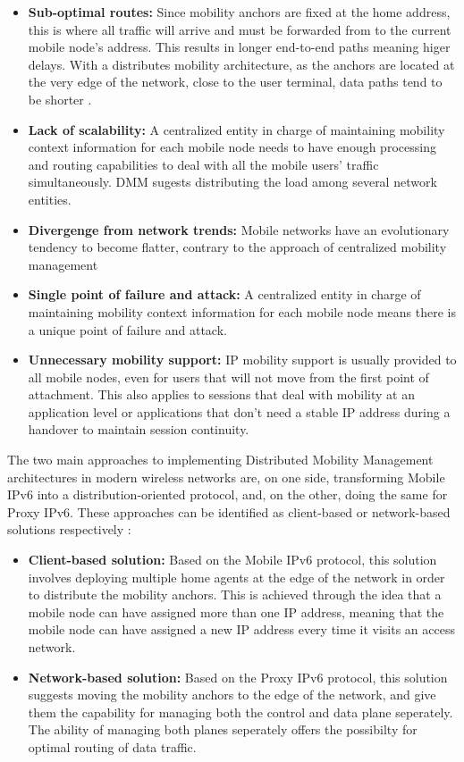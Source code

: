 \begin{itemize}
\item{\textbf{Sub-optimal routes:} Since mobility anchors are fixed at the home address, this is where all traffic will arrive and must be forwarded from to the current mobile node's address. This results in longer end-to-end paths meaning higer delays. With a distributes mobility architecture, as the anchors are located at the very edge of the network, close to the user terminal, data paths tend to be shorter \cite{fama}.}
\item{\textbf{Lack of scalability:} A centralized entity in charge of maintaining mobility context information for each mobile node needs to have enough processing and routing capabilities to deal with all the mobile users' traffic simultaneously. DMM sugests distributing the load among several network entities.} 
\item{\textbf{Divergenge from network trends:} Mobile networks have an evolutionary tendency to become flatter, contrary to the approach of centralized mobility management}
\item{\textbf{Single point of failure and attack:} A centralized entity in charge of maintaining mobility context information for each mobile node means there is a unique point of failure and attack.}
\item{\textbf{Unnecessary mobility support:} IP mobility support is usually provided to all mobile nodes, even for users that will not move from the first point of attachment. This also applies to sessions that deal with mobility at an application level or applications that don't need a stable IP address during a handover to maintain session continuity.}
\end{itemize}

The two main approaches to implementing Distributed Mobility Management architectures in modern wireless networks are, on one side, transforming Mobile IPv6 into a distribution-oriented protocol, and, on the other, doing the same for Proxy IPv6. These approaches can be identified as client-based or network-based solutions respectively \cite{dmm_standard_land}:

\begin{itemize}
\item{\textbf{Client-based solution:} Based on the Mobile IPv6 protocol, this solution involves deploying multiple home agents at the edge of the network in order to distribute the mobility anchors. This is achieved through the idea that a mobile node can have assigned more than one IP address, meaning that the mobile node can have assigned a new IP address every time it visits an access network.}
\item{\textbf{Network-based solution:} Based on the Proxy IPv6 protocol, this solution suggests moving the mobility anchors to the edge of the network, and give them the capability for managing both the control and data plane seperately. The ability of managing both planes seperately offers the possibilty for optimal routing of data traffic.} 
\end{itemize}

